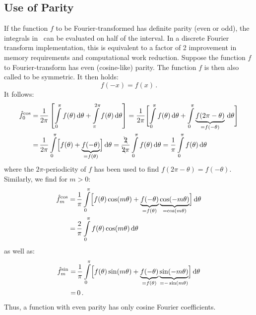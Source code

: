 \subsection{Use of Parity}
If the function $f$ to be Fourier-transformed has definite parity (even or odd),
the integrals in~ can be evaluated on half of the interval.
In a discrete Fourier transform implementation, this is equivalent to a factor of 2
improvement in memory requirements and computational work reduction.
Suppose the function $f$ to Fourier-transform has even (cosine-like) parity.
The function $f$ is then also called to be symmetric.
It then holds:
\begin{equation}
  f(-x) = f(x) \, .
\end{equation}
It follows:
\begin{align}
 \hat{f}_0^\mathrm{cos}
  =&\, \frac{1}{2 \pi} \left[ \int\limits_{0}^{\pi} f(\theta) \,\mathrm{d}\theta + \int\limits_{\pi}^{2 \pi} f(\theta) \,\mathrm{d}\theta \right]
  =    \frac{1}{2 \pi} \Biggl[ \int\limits_{0}^{\pi} f(\theta) \,\mathrm{d}\theta + \int\limits_{0}^{\pi} \underbrace{f(2 \pi - \theta)}_{=f(- \theta)} \,\mathrm{d}\theta \Biggr] \nonumber \\
  =&\, \frac{1}{2 \pi} \int\limits_{0}^{\pi} \Bigl[  f(\theta) + \underbrace{f(- \theta)}_{=f(\theta)} \Bigr] \,\mathrm{d}\theta
  =    \frac{\bcancel{2}}{\bcancel{2} \pi} \int\limits_{0}^{\pi} f(\theta) \,\mathrm{d}\theta
  =    \frac{1}{\pi} \int\limits_{0}^{\pi} f(\theta) \,\mathrm{d}\theta
\end{align}
where the $2 \pi$-periodicity of $f$ has been used to find $f(2 \pi - \theta) = f(-\theta)$.
Similarly, we find for $m>0$:
\begin{align}
 \hat{f}_m^\mathrm{cos}
  =&\, \frac{1}{\pi} \int\limits_{0}^{\pi} \Bigl[ f(  \theta)                           \cos(  m \theta)
                                    + \underbrace{f(- \theta)}_{=f(\theta)} \underbrace{\cos(- m \theta)}_{=\cos(m \theta)} \Bigr] \,\mathrm{d}\theta \nonumber \\
  =&\, \frac{2}{\pi} \int\limits_{0}^{\pi} f(\theta) \cos(m \theta) \,\mathrm{d}\theta
\end{align}
as well as:
\begin{align}
 \hat{f}_m^\mathrm{sin}
  =&\, \frac{1}{\pi} \int\limits_{0}^{\pi} \Bigl[ f(  \theta)                           \sin(  m \theta)
                                    + \underbrace{f(- \theta)}_{=f(\theta)} \underbrace{\sin(- m \theta)}_{=-\sin(m \theta)} \Bigr] \,\mathrm{d}\theta \nonumber \\
  =&\, 0 \, .
\end{align}
Thus, a function with even parity has only cosine Fourier coefficients.

